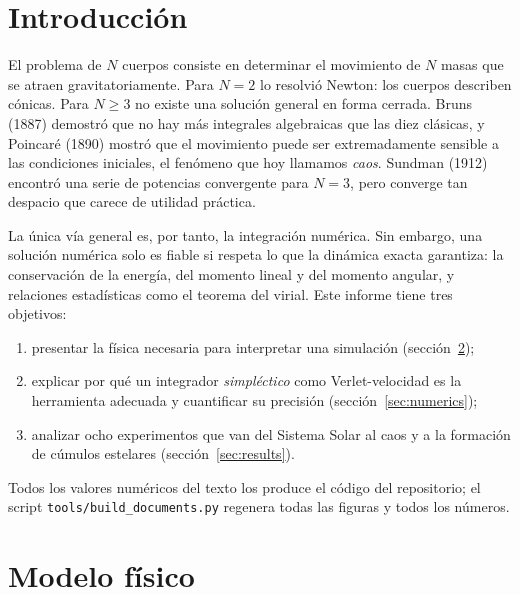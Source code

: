 \documentclass[11pt,a4paper]{article}
\begin{document}
\tableofcontents
\newpage

\section{Introducción}

El problema de $N$ cuerpos consiste en determinar el movimiento de $N$ masas que se
atraen gravitatoriamente. Para $N=2$ lo resolvió Newton: los cuerpos describen cónicas.
Para $N\ge3$ no existe una solución general en forma cerrada. Bruns (1887) demostró que no
hay más integrales algebraicas que las diez clásicas, y Poincaré (1890) mostró que el
movimiento puede ser extremadamente sensible a las condiciones iniciales, el fenómeno que
hoy llamamos \emph{caos}. Sundman (1912) encontró una serie de potencias convergente para
$N=3$, pero converge tan despacio que carece de utilidad práctica.

La única vía general es, por tanto, la integración numérica. Sin embargo, una solución
numérica solo es fiable si respeta lo que la dinámica exacta garantiza: la conservación de
la energía, del momento lineal y del momento angular, y relaciones estadísticas como el
teorema del virial. Este informe tiene tres objetivos:
\begin{enumerate}
  \item presentar la física necesaria para interpretar una simulación (sección~\ref{sec:model});
  \item explicar por qué un integrador \emph{simpléctico} como Verlet-velocidad es la
        herramienta adecuada y cuantificar su precisión (sección~\ref{sec:numerics});
  \item analizar ocho experimentos que van del Sistema Solar al caos y a la formación de
        cúmulos estelares (sección~\ref{sec:results}).
\end{enumerate}
Todos los valores numéricos del texto los produce el código del repositorio; el script
\texttt{tools/build\_documents.py} regenera todas las figuras y todos los números.

\section{Modelo físico}\label{sec:model}
\end{document}
